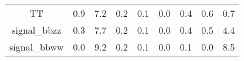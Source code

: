 \begin{sidewaystable}
\begin{center}
\begin{tabular}{ | c | c | c | c| c | c | c | c| c |}
  TT &              0.9 &     7.2 &      0.2 &       0.1 &           0.0 &           0.4 &             0.6 &        0.7 \\
  signal\_bbzz &    0.3 &     7.7 &      0.2 &       0.1 &           0.0 &           0.4 &             0.5 &        4.4 \\
  signal\_bbww &    0.0 &     9.2 &      0.2 &       0.1 &           0.0 &           0.1 &             0.0 &        8.5 \\\hline
\end{tabular}
\label{yieldVariations}
\end{center}
\end{sidewaystable}













